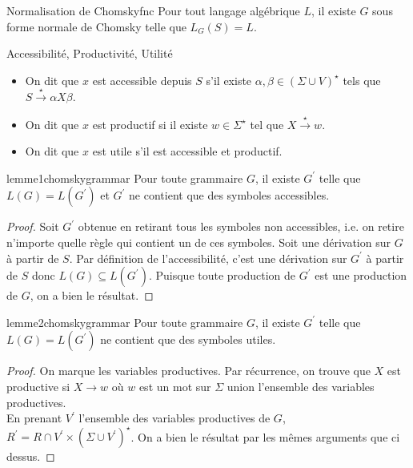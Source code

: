 \documentclass{cours}
\begin{document}
\begin{théorème}{Normalisation de Chomsky}{fnc}
    Pour tout langage algébrique $L$, il existe $G$ sous forme normale de Chomsky telle que $L_{G}(S) = L$.
\end{théorème}

\begin{définition}{Accessibilité, Productivité, Utilité}{}
    \begin{itemize}
    \item On dit que $x$ est accessible depuis $S$ s'il existe $\alpha, \beta \in \left(\Sigma \cup V\right)^{\star}$ tels que $S \xrightarrow{\star} \alpha X \beta$.
    \item On dit que $x$ est productif si il existe $w \in \Sigma^{\star}$ tel que $X \xrightarrow{\star} w$.
    \item On dit que $x$ est utile s'il est accessible et productif.
    \end{itemize}
\end{définition}

\begin{lemme}{}{lemme1chomskygrammar}
    Pour toute grammaire $G$, il existe $G^{'}$ telle que $L(G) = L(G^{'})$ et $G^{'}$ ne contient que des symboles accessibles.
\end{lemme}

\begin{proof}
    Soit $G^{'}$ obtenue en retirant tous les symboles non accessibles, i.e. on retire n'importe quelle règle qui contient un de ces symboles. Soit une dérivation sur $G$ à partir de $S$. Par définition de l'accessibilité, c'est une dérivation sur $G^{'}$ à partir de $S$ donc $L(G) \subseteq L(G^{'})$. Puisque toute production de $G^{'}$ est une production de $G$, on a bien le résultat.
\end{proof}

\begin{lemme}{}{lemme2chomskygrammar}
    Pour toute grammaire $G$, il existe $G^{'}$ telle que $L(G) = L(G^{'})$ ne contient que des symboles utiles.
\end{lemme}
\begin{proof}
    On marque les variables productives. Par récurrence, on trouve que $X$ est productive si $X \rightarrow w$ où $w$ est un mot sur $\Sigma$ union l'ensemble des variables productives.\\
    En prenant $V^{'}$ l'ensemble des variables productives de $G$, $R^{'} = R \cap V^{'} \times \left(\Sigma \cup V^{'}\right)^{\star}$. On a bien le résultat par les mêmes arguments que ci dessus.
\end{proof}
\end{document}
